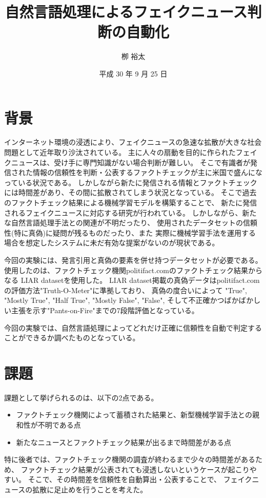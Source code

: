\documentclass[twocolumn, a4paper, uplatex]{UECIEresume}
\title{自然言語処理によるフェイクニュース判断の自動化}
\date{平成 30 年 9 月 25 日}
\affiliation{総合情報学科 メディア情報学 コース}
\author{栁 裕太}
\begin{document}
\maketitle

\section{背景}
インターネット環境の浸透により、フェイクニュースの急速な拡散が大きな社会問題として近年取り沙汰されている。
主に人々の扇動を目的に作られたフェイクニュースは、受け手に専門知識がない場合判断が難しい。
そこで有識者が発信された情報の信頼性を判断・公表するファクトチェックが主に米国で盛んになっている状況である。
しかしながら新たに発信される情報とファクトチェックには時間差があり、その間に拡散されてしまう状況となっている。
そこで過去のファクトチェック結果による機械学習モデルを構築することで、
新たに発信されるフェイクニュースに対応する研究が行われている\cite{nb}\cite{gilda}。
しかしながら、新たな自然言語処理手法との関連が不明だったり、
使用されたデータセットの信頼性(特に真偽)に疑問が残るものだったり、また
実際に機械学習手法を運用する場合を想定したシステムに未だ有効な提案がないのが現状である。

今回の実験には、発言引用と真偽の要素を併せ持つデータセットが必要である。
使用したのは、ファクトチェック機関politifact.comのファクトチェック結果からなる
LIAR datasetを使用した\cite{pants}。
LIAR dataset掲載の真偽データはpolitifact.comの評価方法"Truth-O-Meter"に準拠\cite{truth}しており、
真偽の度合いによって
"True", "Mostly True", "Half True", "Mostly False", "False",
そして不正確かつばかばかしい主張を示す"Pants-on-Fire"までの7段階評価となっている\cite{pants}。

今回の実験では、自然言語処理によってどれだけ正確に信頼性を自動で判定することができるか調べたものとなっている。

\section{課題}
課題として挙げられるのは、以下の2点である。
\begin{itemize}
  \item ファクトチェック機関によって蓄積された結果と、新型機械学習手法との親和性が不明である点
  \item 新たなニュースとファクトチェック結果が出るまで時間差がある点
\end{itemize}
特に後者では、ファクトチェック機関の調査が終わるまで少々の時間差があるため、
ファクトチェック結果が公表されても浸透しないというケースが起こりやすい。
そこで、その時間差を信頼性を自動算出・公表することで、
フェイクニュースの拡散に足止めを行うことを考えた。
\end{document}
